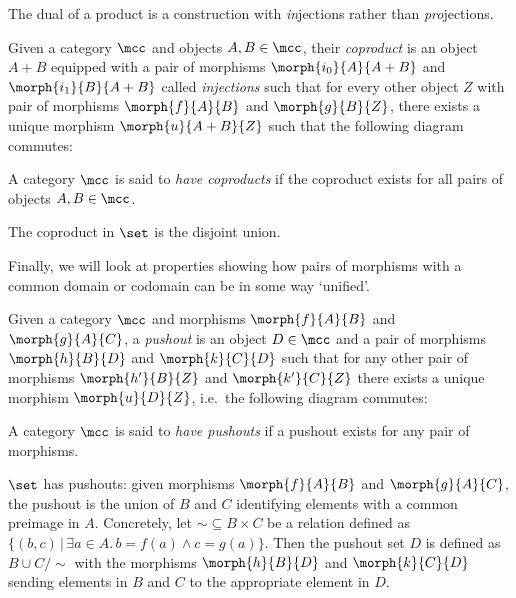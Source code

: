 The dual of a product is a construction with \emph{in}jections rather than
\emph{pro}jections.

\begin{definition}[Coproduct]
    Given a category \(\mcc\) and objects \(A,B \in \mcc\), their \emph{coproduct}
    is an object \(A + B\) equipped with a pair of morphisms
    \(\morph{i_0}{A}{A + B}\) and \(\morph{i_1}{B}{A + B}\) called
    \emph{injections} such that for every other object \(Z\) with pair of
    morphisms \(\morph{f}{A}{B}\) and \(\morph{g}{B}{Z}\), there exists a unique
    morphism \(\morph{u}{A + B}{Z}\) such that the following diagram
    commutes:
    \begin{center}
        
    \end{center}
    A category \(\mcc\) is said to \emph{have coproducts} if the coproduct
    exists for all pairs of objects \(A,B \in \mcc\).
\end{definition}

\begin{example}
    The coproduct in \(\set\) is the disjoint union.
\end{example}

Finally, we will look at properties showing how pairs of morphisms with a
common domain or codomain can be in some way `unified'.

\begin{definition}[Pushout]
    Given a category \(\mcc\) and morphisms
    \(\morph{f}{A}{B}\) and \(\morph{g}{A}{C}\), a
    \emph{pushout} is an object \(D \in \mcc\) and a pair of morphisms
    \(\morph{h}{B}{D}\) and \(\morph{k}{C}{D}\) such that for any other pair of
    morphisms \(\morph{h^\prime}{B}{Z}\) and \(\morph{k^\prime}{C}{Z}\) there
    exists a unique morphism \(\morph{u}{D}{Z}\), i.e.\ the following diagram
    commutes:
    \begin{center}
        
    \end{center}
    A category \(\mcc\) is said to \emph{have pushouts} if a pushout exists for
    any pair of morphisms.
\end{definition}

\begin{example}
    \(\set\) has pushouts: given morphisms \(\morph{f}{A}{B}\) and
    \(\morph{g}{A}{C}\), the pushout is the union of \(B\) and \(C\) identifying
    elements with a common preimage in \(A\).
    Concretely, let \({\sim} \subseteq B \times C\) be a relation defined as
    \(\{(b, c) \,|\, \exists a \in A.\, b = f(a) \wedge c = g(a)\}\).
    Then the pushout set \(D\) is defined as \(B \cup C / \sim\) with the
    morphisms \(\morph{h}{B}{D}\) and \(\morph{k}{C}{D}\) sending elements in
    \(B\) and \(C\) to the appropriate element in \(D\).
\end{example}

